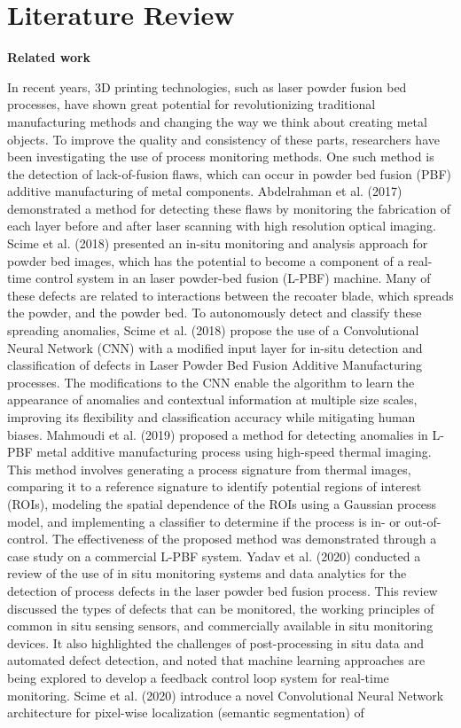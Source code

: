 \chapter{Literature Review} 
\label{chp:literature}

    \textbf{Related work}\
    
    In recent years, 3D printing technologies, such as laser powder fusion bed processes, have shown great potential for revolutionizing traditional manufacturing methods and changing the way we think about creating metal objects. To improve the quality and consistency of these parts, researchers have been investigating the use of process monitoring methods.
    One such method is the detection of lack-of-fusion flaws, which can occur in powder bed fusion (PBF) additive manufacturing of metal components. Abdelrahman et al. (2017) \nocite{abdelrahman2017flaw} demonstrated a method for detecting these flaws by monitoring the fabrication of each layer before and after laser scanning with high resolution optical imaging. Scime et al. (2018)\nocite{scime2018anomaly} presented an in-situ monitoring and analysis approach for powder bed images, which has the potential to become a component of a real-time control system in an laser powder-bed fusion (L-PBF) machine. Many of these defects are related to interactions between the recoater blade, which spreads the powder, and the powder bed. To autonomously detect and classify these spreading anomalies, Scime et al. (2018)\nocite{scime2018multi} propose the use of a Convolutional Neural Network (CNN) with a modified input layer for in-situ detection and classification of defects in Laser Powder Bed Fusion Additive Manufacturing processes. The modifications to the CNN enable the algorithm to learn the appearance of anomalies and contextual information at multiple size scales, improving its flexibility and classification accuracy while mitigating human biases. Mahmoudi et al. (2019)\nocite{mahmoudi2019layerwise} proposed a method for detecting anomalies in L-PBF metal additive manufacturing process using high-speed thermal imaging. This method involves generating a process signature from thermal images, comparing it to a reference signature to identify potential regions of interest (ROIs), modeling the spatial dependence of the ROIs using a Gaussian process model, and implementing a classifier to determine if the process is in- or out-of-control. The effectiveness of the proposed method was demonstrated through a case study on a commercial L-PBF system.  Yadav et al. (2020)\nocite{yadav2020situ} conducted a review of the use of in situ monitoring systems and data analytics for the detection of process defects in the laser powder bed fusion process. This review discussed the types of defects that can be monitored, the working principles of common in situ sensing sensors, and commercially available in situ monitoring devices. It also highlighted the challenges of post-processing in situ data and automated defect detection, and noted that machine learning approaches are being explored to develop a feedback control loop system for real-time monitoring. Scime et al. (2020) \nocite{scime2020layer} introduce a novel Convolutional Neural Network architecture for pixel-wise localization (semantic segmentation) of 